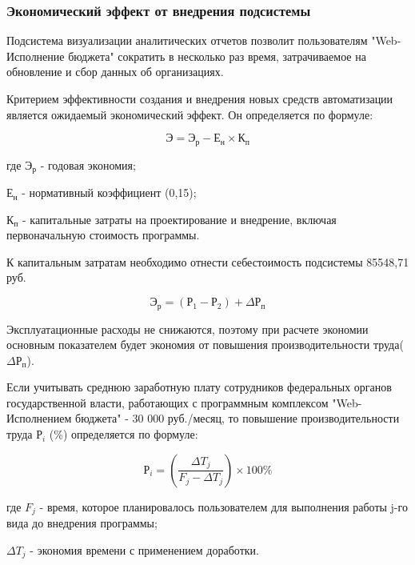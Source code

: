 \documentclass[a4paper]{extarticle}
\numberwithin{equation}{section}
\begin{document}
\subsubsection{Экономический эффект от внедрения подсистемы}
Подсистема визуализации аналитических отчетов позволит пользователям "Web-Исполнение бюджета" сократить в несколько раз время, затрачиваемое на обновление и сбор данных об организациях.\par
Критерием эффективности создания и внедрения новых средств автоматизации является ожидаемый экономический эффект. Он определяется по формуле:\par
\begin{equation}
\label{form19}
	\text{Э}=\text{Э}_\text{р}-\text{Е}_\text{н}\times \text{К}_\text{п}
\end{equation}\par
где $\text{Э}_\text{р}$ - годовая экономия;\par
$\text{Е}_\text{н}$ - нормативный коэффициент (0,15);\par
$\text{К}_\text{п}$ - капитальные затраты на проектирование и внедрение, включая первоначальную стоимость программы.\par
К капитальным затратам необходимо отнести себестоимость подсистемы 85548,71 руб.\par
\begin{equation}
\label{form20}
	\text{Э}_\text{р}=(\text{Р}_\text{1}-\text{Р}_\text{2})+\Delta\text{Р}_\text{п}
\end{equation}\par
Эксплуатационные расходы не снижаются, поэтому при расчете экономии основным показателем будет экономия от повышения производительности труда($\Delta\text{Р}_\text{п}$).\par
Если учитывать среднюю заработную плату сотрудников федеральных органов государственной власти, работающих с программным комплексом "Web-Исполнением бюджета" - 30 000 руб./месяц, то повышение производительности труда $\text{Р}_i$ (\%) определяется по формуле:\par
\begin{equation}
\label{form21}
	\text{Р}_i=(\frac{\Delta T_j}{F_j-\Delta T_j})\times 100\%
\end{equation}\par
где $F_j$ - время, которое планировалось пользователем для выполнения работы j-го вида до внедрения программы;\par
$\Delta T_j$ - экономия времени с применением доработки.\par
\end{document}
